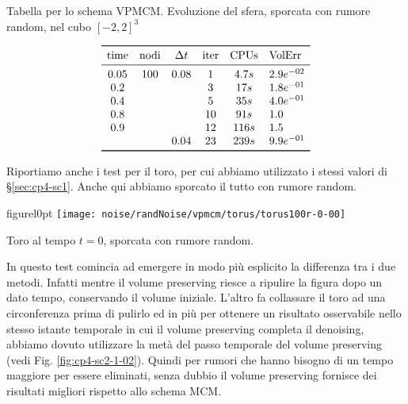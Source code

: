 \begin{table}[htb!]
\caption{Tabella per lo schema VPMCM. Evoluzione del sfera, sporcata
  con rumore random, nel cubo $[-2,2]^3$}
\label{tab:cp4-sc2-1-01}
\[
\begin{array}{*{5}{c}l}
    \toprule
    \text{time} &\text{nodi} &\Delta t &\text{iter} &\text{CPUs}&\text{VolErr} \\
    \midrule
     0.05       & 100        & 0.08    & 1          & 4.7s     &2.9e^{-02}\\
     0.2        &            &         & 3          & 17s      &1.8e^{-01}\\ 
     0.4        &            &         & 5          & 35s      &4.0e^{-01}\\ 
     0.8        &            &         & 10         & 91s      &1.0\\
     0.9        &            &         & 12         & 116s     &1.5\\
                &            & 0.04    & 23         & 239s     &9.9e^{-01}\\  
     \bottomrule
\end{array}
\]
\end{table}
\newpage 
Riportiamo anche i test per il toro, per cui abbiamo utilizzato i
stessi valori di §\ref{sec:cp4-sc1}. Anche qui abbiamo
sporcato il tutto con rumore random.

\begin{wrapfloat}{figure}{l}{0pt}
\texttt{[image: noise/randNoise/vpmcm/torus/torus100r-0-00]}
\caption{Toro al tempo $t=0$, sporcata con rumore random.}
\end{wrapfloat}

In questo test comincia ad emergere in modo più esplicito la
differenza tra i due metodi. Infatti mentre il volume preserving
riesce a ripulire la figura dopo un dato tempo, conservando il volume 
iniziale. L'altro fa collassare il toro ad una circonferenza prima di
pulirlo ed in più per ottenere un risultato osservabile nello stesso
istante temporale in cui il volume preserving completa il denoising,
abbiamo dovuto utilizzare la metà del passo temporale del
volume preserving (vedi Fig. \ref{fig:cp4-sc2-1-02}). Quindi per
rumori  che hanno  bisogno di un tempo maggiore per essere eliminati,
senza dubbio il volume preserving fornisce dei risultati migliori
rispetto allo schema MCM.

